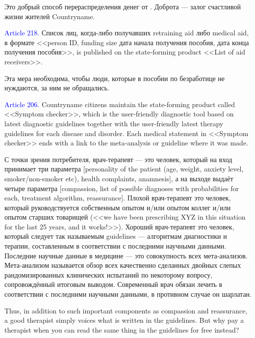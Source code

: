 \documentclass[11pt]{article}
\theoremstyle{remark}
\theoremstyle{definition}
\begin{document}
Это добрый способ перераспределения денег от . Доброта --- залог счастливой жизни жителей Countryname.


\color{black}



\textcolor{blue}{Article 218.} Список лиц, когда-либо получавших retraining aid либо medical aid, в формате <<person ID, funding size дата начала получения пособия, дата конца получения пособия>>, is published on the state-forming product <<List of aid receivers>>.

\color{blue}

Эта мера необходима, чтобы люди, которые в пособии по безработице не нуждаются, за ним не обращались.

\color{black}





\textcolor{blue}{Article 206.} Countryname citizens maintain the state-forming product called <<Symptom checker>>, which is the user-friendly diagnostic tool based on latest diagnostic guidelines together with the user-friendly latest therapy guidelines for each disease and disorder. Each medical statement in <<Symptom checker>> ends with a link to the meta-analysis or guideline where it was made. 

\color{blue}

С точки зрения потребителя, врач-терапевт --- это человек, который на вход принимает три параметра [personality of the patient (age, weight, anxiety level, smoker/non-smoker etc), health complaints, anamnesis], а на выходе выдаёт четыре параметра [compassion, list of possible diagnoses with probabilities for each, treatment algorithm, reassurance]. Плохой врач-терапевт это человек, который руководствуется собственным опытом и/или опытом коллег и/или опытом старших товарищей (<<we have been prescribing XYZ in this situation for the last 25 years, and it works!>>). Хороший врач-терапевт это человек, который следует так называемым guidelines --- алгоритмам диагностики и терапии, составленным в соответствии с последними научными данными. Последние научные данные в медицине --- это совокупность всех мета-анализов. Мета-анализом называется обзор всех качественно сделанных двойных слепых рандомизированных клинических испытаний по некоторому вопросу, сопровождённый итоговым выводом. Современный врач обязан лечить в соответствии с последними научными данными, в противном случае он шарлатан.

Thus, in addition to such important components as compassion and reassurance, a good therapist simply voices what is written in the guidelines. But why pay a therapist when you can read the same thing in the guidelines for free instead?
\end{document}
